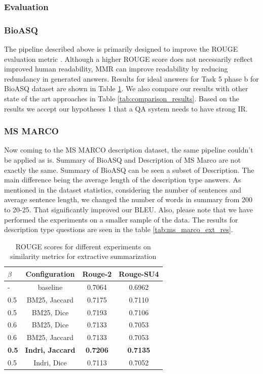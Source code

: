 \subsubsection{\textbf{Evaluation}}
\subsubsection*{BioASQ} 
The pipeline described above is primarily designed to improve the ROUGE evaluation metric \cite{Rougue}. Although a higher ROUGE score does not necessarily reflect improved human readability, MMR can improve readability by reducing redundancy in generated answers.
Results for ideal answers for Task 5 phase b for BioASQ dataset are shown in Table \ref{tab:rouge_extractive_summarization}. We also compare our results with other state of the art approaches in Table \ref{tab:comparison_results}. Based on the results we accept our hypotheses 1 that a QA system needs to have strong IR.
\subsubsection*{MS MARCO}
Now coming to the MS MARCO description dataset, the same pipeline couldn't be applied as is. Summary of BioASQ and Description of MS Marco are not exactly the same. Summary of BioASQ can be seen a subset of Description. The main difference being the average length of the description type answers. As mentioned in the dataset statistics, considering the number of sentences and average sentence length, we changed the number of words in summary from 200 to 20-25. That significantly improved our BLEU. Also, please note that we have performed the experiments on a smaller sample of the data. The results for description type questions are seen in the table \ref{tab:ms_marco_ext_res}.

\begin{table}[t!]
    \centering
    \begin{tabular}{|l|c|c|c|}
         \hline
            $\beta$& Configuration & Rouge-2 & Rouge-SU4 \\
        \hline
        \hline
        - & baseline & 0.7064 & 0.6962 \\
        \hline
        0.5 & BM25, Jaccard  & 0.7175 & 0.7110  \\ 
        \hline
        0.5 & BM25, Dice & 0.7193 & 0.7106  \\ 
        \hline
        0.6 & BM25, Dice & 0.7133 & 0.7053  \\ 
        \hline
        0.6 & BM25, Jaccard & 0.7133 & 0.7053  \\
        \hline
        \textbf{0.5} & \textbf{ Indri, Jaccard} & \textbf{0.7206} & \textbf{0.7135}  \\ 
        \hline
         0.5 & Indri, Dice & 0.7113 & 0.7052  \\ 
        \hline
    \end{tabular}
    \caption{ROUGE scores for different experiments on similarity metrics for extractive summarization}
    \label{tab:rouge_extractive_summarization}
\end{table}

